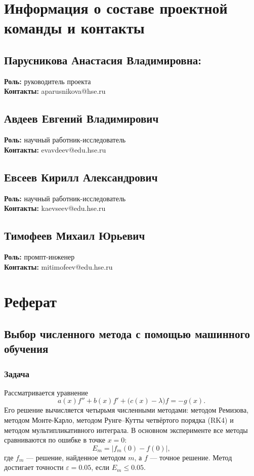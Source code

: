 \documentclass[14pt,a4paper]{extarticle}
\begin{document}
\section*{Информация о составе проектной команды и контакты}
{}

\subsection*{Парусникова Анастасия Владимировна:}
\textbf{Роль:} руководитель проекта\\
\textbf{Контакты:} aparusnikova@hse.ru
\subsection*{Авдеев Евгений Владимирович}
\textbf{Роль:} научный работник-исследователь\\
\textbf{Контакты:} evavdeev@edu.hse.ru
\subsection*{Евсеев Кирилл Александрович}
\textbf{Роль:} научный работник-исследователь\\
\textbf{Контакты:} kaevseev@edu.hse.ru
\subsection*{Тимофеев Михаил Юрьевич}
\textbf{Роль:} промпт-инженер\\
\textbf{Контакты:} mitimofeev@edu.hse.ru
\clearpage

\section*{Реферат}
{}
\subsection*{Выбор численного метода с помощью машинного обучения}
\begingroup
\titlespacing*{\subsubsection}{0pt}{5pt}{2pt}
\subsubsection*{Задача}
Рассматривается уравнение
\[
a(x)f''+b(x)f'+\bigl(c(x)-\lambda\bigr)f=-g(x).
\]
Его решение вычисляется четырьмя численными методами: методом Ремизова,
методом Монте-Карло, методом Рунге--Кутты четвёртого порядка (RK4)
и методом мультипликативного интеграла. В основном эксперименте
все методы сравниваются по ошибке в точке $x=0$:
\[
E_m=\bigl|f_m(0)-f(0)\bigr|,
\]
где $f_m$ --- решение, найденное методом $m$, а $f$ --- точное решение.
Метод достигает точности $\varepsilon=0.05$, если $E_m\le0.05$.
\end{document}
